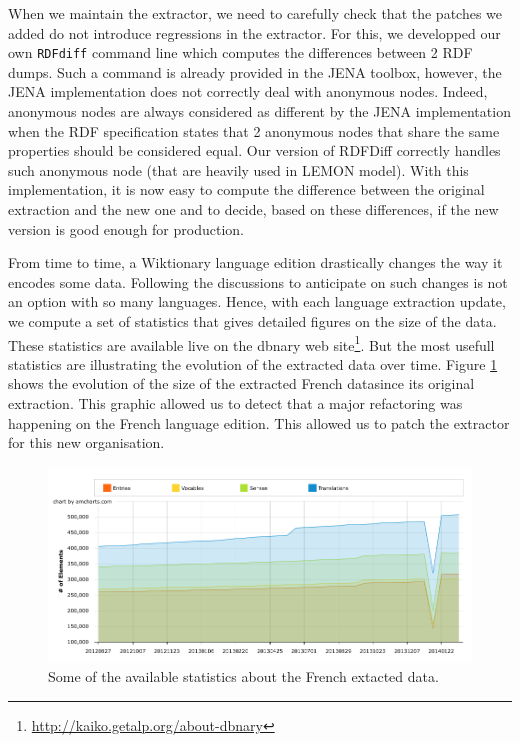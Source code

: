 \documentclass[10pt, a4paper]{article}
\begin{document}
When we maintain the extractor, we need to carefully check that the patches we added do not introduce regressions in the extractor. For this, we developped our own \texttt{RDFdiff} command line which computes the differences between 2 RDF dumps. Such a command is already provided in the JENA toolbox, however, the JENA implementation does not correctly deal with anonymous nodes. Indeed, anonymous nodes are always considered as different by the JENA implementation when the RDF specification states that 2 anonymous nodes that share the same properties should be considered equal. Our version of RDFDiff correctly handles such anonymous node (that are heavily used in LEMON model). With this implementation, it is now easy to compute the difference between the original extraction and the new one and to decide, based on these differences, if the new version is good enough for production.

From time to time, a Wiktionary language edition drastically changes the way it encodes some data. Following the discussions to anticipate on such changes is not an option with so many languages. Hence, with each language extraction update, we compute a set of statistics that gives detailed figures on the size of the data. These statistics are available live on the dbnary web site\footnote{\url{http://kaiko.getalp.org/about-dbnary}}. But the most usefull statistics are illustrating the evolution of the extracted data over time. Figure \ref{fig:french} shows the evolution of the size of the extracted French datasince its original extraction. This graphic allowed us to detect that a major refactoring was happening on the French language edition. This allowed us to patch the extractor for this new organisation.


\begin{figure}[htb]
	\begin{center}
		\includegraphics[width=\textwidth]{french.png}
	\end{center}
	\caption{Some of the available statistics about the French extacted data.}
	\label{fig:french}
\end{figure}
\end{document}
